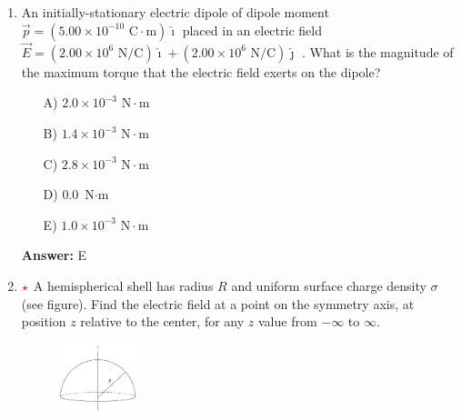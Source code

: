 \begin{enumerate}
    \begin{multicols}{5}
    \begin{itemize}
        \item[A)] 60 mJ
        \item[B)] 30 mJ
        \item[C)] 0
        \item[D)] 20 mJ
        \item[E)] 120 mJ
    \end{itemize}
    \end{multicols}

    \textbf{Answer:} A

    \item An initially-stationary electric dipole of dipole moment $\vec{p}=(5.00 \times 10^{-10} \text{ C} \cdot \text{m})\hat\imath$ placed in an electric field $\vec{E}= (2.00 \times 10^6 \text{ N/C})\hat{\imath} + (2.00 \times 10^6 \text{ N/C})\hat{\jmath}$ . What is the magnitude of the maximum torque that the electric field exerts on the dipole?

    \begin{multicols}{5}
    \begin{itemize}
        \item[A)] $2.0\times10^{-3}\text{ N}\cdot\text{m}$ 
        \item[B)] $1.4\times10^{-3}\text{ N}\cdot\text{m}$ 
        \item[C)] $2.8\times10^{-3}\text{ N}\cdot\text{m}$ 
        \item[D)] 0.0 $\text{N}\cdot\text{m}$ 
        \item[E)] $1.0\times10^{-3}\text{ N}\cdot\text{m}$ 
    \end{itemize}
    \end{multicols}

    \textbf{Answer:} E

    \item $\color{red}{\star}$ A hemispherical shell has radius $R$ and uniform surface charge density $\sigma$ (see figure). Find the electric field at a point on the symmetry axis, at position $z$ relative to the center, for any $z$ value from $-\infty$ to $\infty$.

    \begin{figure}[H]
        \centering
        \includegraphics[width=0.22\textwidth]{figures-workshop01/problem-17.png}
    \end{figure}


\end{enumerate}
